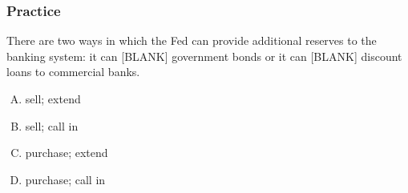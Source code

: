 \documentclass{beamer}
\begin{document}
\begin{practiceframe}
\frametitle{Practice}

    There are two ways in which the Fed can provide additional reserves to the banking system: it can [BLANK] government bonds or it can [BLANK] discount loans to commercial banks.
    \begin{enumerate}[A. ]
        \item sell; extend
        \item sell; call in
        \item purchase; extend
        \item purchase; call in
    \end{enumerate}

\end{practiceframe}
\end{document}

